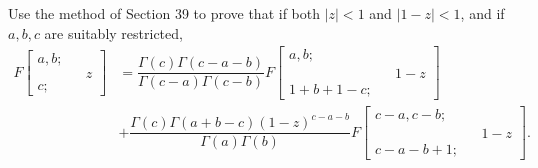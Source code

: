 \begin{problem}\label{problem15chapter4}
Use the method of Section 39 to prove that if both $|z|<1$ and $|1-z|<1$, and if $a,b,c$ are suitably restricted,
$$\begin{array}{ll}
F \left[ \begin{array}{rlr}
a,b; & & \\
& & z \\
c; & &
\end{array} \right] &= \dfrac{\Gamma(c)\Gamma(c-a-b)}{\Gamma(c-a)\Gamma(c-b)} F \left[ \begin{array}{rlr}
a,b; & & \\
& & 1-z \\
1+b+1-c; & & 
\end{array} \right] \\
&+ \dfrac{\Gamma(c)\Gamma(a+b-c)(1-z)^{c-a-b}}{\Gamma(a)\Gamma(b)} F \left[ \begin{array}{rlr}
c-a,c-b; & & \\
& & 1-z \\
c-a-b+1; & &
\end{array} \right].
\end{array}$$
\end{problem}
